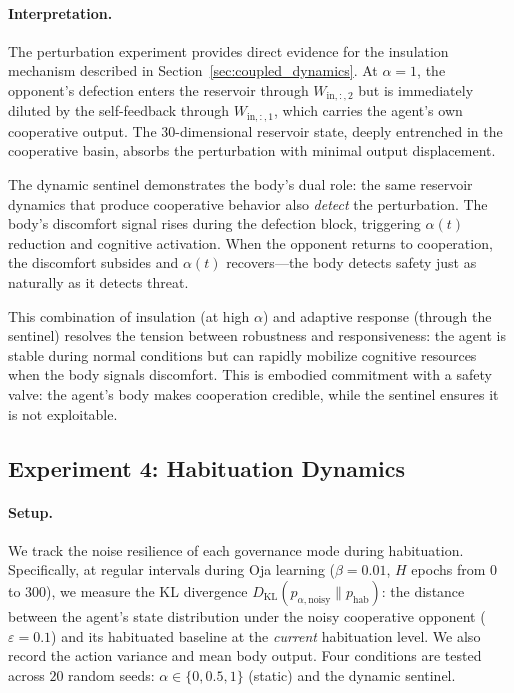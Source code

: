 \documentclass[11pt,a4paper]{article}
\theoremstyle{definition}
\newcommand{\KL}{D_{\mathrm{KL}}}
\begin{document}
\paragraph{Interpretation.}
The perturbation experiment provides direct evidence for the insulation
mechanism described in Section~\ref{sec:coupled_dynamics}.  At $\alpha = 1$,
the opponent's defection enters the reservoir through $W_{\mathrm{in},{:,2}}$ but is
immediately diluted by the self-feedback through $W_{\mathrm{in},{:,1}}$, which carries
the agent's own cooperative output.  The $30$-dimensional reservoir state,
deeply entrenched in the cooperative basin, absorbs the perturbation with
minimal output displacement.

The dynamic sentinel demonstrates the body's dual role: the same reservoir
dynamics that produce cooperative behavior also \emph{detect} the
perturbation.  The body's discomfort signal rises during the defection
block, triggering $\alpha(t)$ reduction and cognitive activation.
When the opponent returns to cooperation, the discomfort subsides and
$\alpha(t)$ recovers---the body detects safety just as naturally as it
detects threat.

This combination of insulation (at high $\alpha$) and adaptive response
(through the sentinel) resolves the tension between robustness and
responsiveness: the agent is stable during normal conditions but can
rapidly mobilize cognitive resources when the body signals discomfort.
This is embodied commitment \citep{frank1988, nesse2001} with a safety
valve: the agent's body makes cooperation credible, while the sentinel
ensures it is not exploitable.

\subsection{Experiment 4: Habituation Dynamics}
\label{sec:exp_habituation}

\paragraph{Setup.}
We track the noise resilience of each governance mode during habituation.
Specifically, at regular intervals during Oja learning ($\beta = 0.01$,
$H$ epochs from $0$ to $300$), we measure the KL divergence
$\KL(p_{\alpha,\mathrm{noisy}} \| p_{\mathrm{hab}})$: the distance
between the agent's state distribution under the noisy cooperative
opponent ($\varepsilon = 0.1$) and its habituated baseline at the
\emph{current} habituation level.  We also record the action variance
and mean body output.  Four conditions are tested across $20$ random
seeds: $\alpha \in \{0, 0.5, 1\}$ (static) and the dynamic sentinel.
\end{document}
